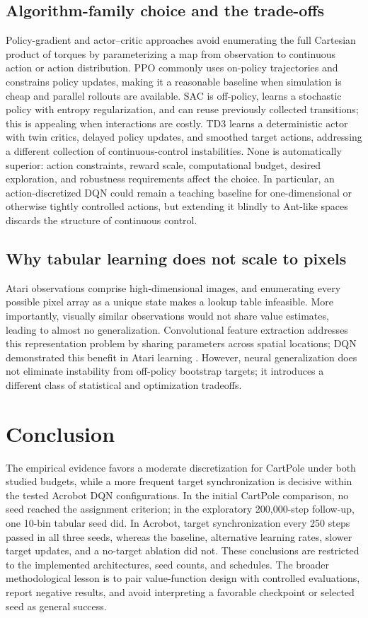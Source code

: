 \documentclass[conference,10pt]{IEEEtran}
\begin{document}
\subsection{Algorithm-family choice and the trade-offs}
Policy-gradient and actor--critic approaches avoid enumerating the full Cartesian product of torques by parameterizing a map from observation to continuous action or action distribution. PPO commonly uses on-policy trajectories and constrains policy updates, making it a reasonable baseline when simulation is cheap and parallel rollouts are available. SAC is off-policy, learns a stochastic policy with entropy regularization, and can reuse previously collected transitions; this is appealing when interactions are costly. TD3 learns a deterministic actor with twin critics, delayed policy updates, and smoothed target actions, addressing a different collection of continuous-control instabilities. None is automatically superior: action constraints, reward scale, computational budget, desired exploration, and robustness requirements affect the choice. In particular, an action-discretized DQN could remain a teaching baseline for one-dimensional or otherwise tightly controlled actions, but extending it blindly to Ant-like spaces discards the structure of continuous control.

\subsection{Why tabular learning does not scale to pixels}
Atari observations comprise high-dimensional images, and enumerating every possible pixel array as a unique state makes a lookup table infeasible. More importantly, visually similar observations would not share value estimates, leading to almost no generalization. Convolutional feature extraction addresses this representation problem by sharing parameters across spatial locations; DQN demonstrated this benefit in Atari learning \cite{Mnih2015}. However, neural generalization does not eliminate instability from off-policy bootstrap targets; it introduces a different class of statistical and optimization tradeoffs.

\balance
\section{Conclusion}
The empirical evidence favors a moderate discretization for CartPole under both studied budgets, while a more frequent target synchronization is decisive within the tested Acrobot DQN configurations. In the initial CartPole comparison, no seed reached the assignment criterion; in the exploratory 200,000-step follow-up, one 10-bin tabular seed did. In Acrobot, target synchronization every 250 steps passed in all three seeds, whereas the baseline, alternative learning rates, slower target updates, and a no-target ablation did not. These conclusions are restricted to the implemented architectures, seed counts, and schedules. The broader methodological lesson is to pair value-function design with controlled evaluations, report negative results, and avoid interpreting a favorable checkpoint or selected seed as general success.
\end{document}
